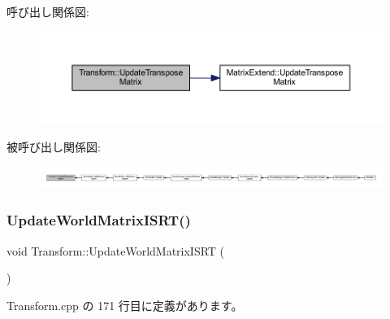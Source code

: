 呼び出し関係図\+:\nopagebreak
\begin{figure}[H]
\begin{center}
\leavevmode
\includegraphics[width=350pt]{class_transform_a486ae5501b5081b22ee053f787e0e4a2_cgraph}
\end{center}
\end{figure}
被呼び出し関係図\+:
\nopagebreak
\begin{figure}[H]
\begin{center}
\leavevmode
\includegraphics[width=350pt]{class_transform_a486ae5501b5081b22ee053f787e0e4a2_icgraph}
\end{center}
\end{figure}
\mbox{\label{class_transform_a3d56e19fba7f44d5f938d62481846fbc}} 
\subsubsection{\texorpdfstring{Update\+World\+Matrix\+I\+S\+R\+T()}{UpdateWorldMatrixISRT()}}
{\footnotesize\ttfamily void Transform\+::\+Update\+World\+Matrix\+I\+S\+RT (\begin{DoxyParamCaption}{ }\end{DoxyParamCaption})}



 Transform.\+cpp の 171 行目に定義があります。

